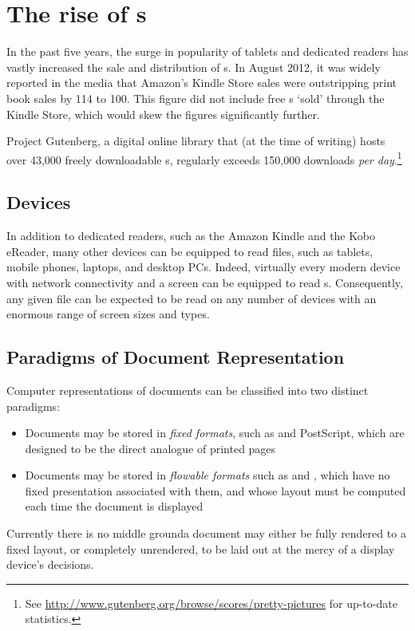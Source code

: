 \cleardoublepage
\chapter{The rise of \ebook{}s} \label{ch:intro}

In the past five years, the surge in popularity of tablets and dedicated \ebook{} readers has vastly increased the sale and distribution of \ebook{}s. In August 2012, it was widely reported in the media that Amazon's Kindle Store sales were outstripping print book sales by 114 to 100. This figure did not include free \ebook{}s `sold' through the Kindle Store, which would skew the figures significantly further.

Project Gutenberg, a digital online library that (at the time of writing) hosts over 43,000 freely downloadable \ebook{}s, regularly exceeds 150,000 downloads \emph{per day}.\footnote{See \url{http://www.gutenberg.org/browse/scores/pretty-pictures} for up-to-date statistics.}

\section{Devices}
In addition to dedicated \ebook{} readers, such as the Amazon Kindle and the Kobo eReader, many other devices  can be equipped to read \ebook{} files, such as tablets, mobile phones, laptops, and desktop PCs. Indeed, virtually every modern device with network connectivity and a screen can be equipped to read \ebook{}s. Consequently, any given \ebook{} file can be expected to be read on any number of devices with an enormous range of screen sizes and types. 


\section{Paradigms of Document Representation}
Computer representations of documents can be classified into two distinct paradigms:
\begin{itemize}
 \item Documents may be stored in \emph{fixed formats}, such as \pdf{} and PostScript, which are designed to be the direct analogue of printed pages
 \item Documents may be stored in \emph{flowable formats} such as \html{} and \epub{}, which have no fixed presentation associated with them, and whose layout must be computed each time the document is displayed
\end{itemize}
Currently there is no middle ground\ed a document may either be fully rendered to a fixed layout, or completely unrendered, to be laid out at the mercy of a display device's decisions.

